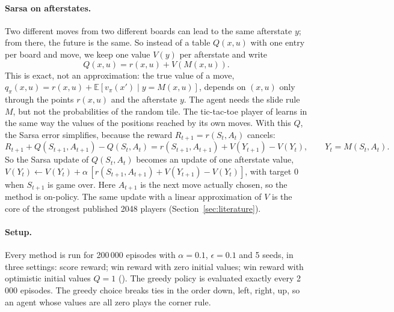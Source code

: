 \documentclass[11pt,a4paper]{article}
\theoremstyle{remark}
\newcommand{\E}{\mathbb{E}}
\newcommand{\act}[1]{\textsf{#1}}
\begin{document}
\paragraph{Sarsa on afterstates.} Two different moves from two different boards can lead to the same afterstate $y$; from there, the future is the same. So instead of a table $Q(x,u)$ with one entry per board and move, we keep one value $V(y)$ per afterstate and write
\[
Q(x,u)=r(x,u)+V(M(x,u)).
\]
This is exact, not an approximation: the true value of a move, $q_\pi(x,u)=r(x,u)+\E[v_\pi(x')\mid y=M(x,u)]$, depends on $(x,u)$ only through the points $r(x,u)$ and the afterstate $y$. The agent needs the slide rule $M$, but not the probabilities of the random tile. The tic-tac-toe player of \cite[\S1.5]{sutton2018} learns in the same way the values of the positions reached by its own moves. With this $Q$, the Sarsa error simplifies, because the reward $R_{t+1}=r(S_t,A_t)$ cancels:
\[
R_{t+1}+Q(S_{t+1},A_{t+1})-Q(S_t,A_t)=r(S_{t+1},A_{t+1})+V(Y_{t+1})-V(Y_t),\qquad Y_t=M(S_t,A_t).
\]
So the Sarsa update of $Q(S_t,A_t)$ becomes an update of one afterstate value, $V(Y_t)\leftarrow V(Y_t)+\alpha\,[r(S_{t+1},A_{t+1})+V(Y_{t+1})-V(Y_t)]$, with target 0 when $S_{t+1}$ is game over. Here $A_{t+1}$ is the next move actually chosen, so the method is on-policy. The same update with a linear approximation of $V$ is the core of the strongest published 2048 players (Section~\ref{sec:literature}).

\paragraph{Setup.} Every method is run for 200\,000 episodes with $\alpha=0.1$, $\epsilon=0.1$ and 5 seeds, in three settings: score reward; win reward with zero initial values; win reward with optimistic initial values $Q=1$ (\cite[\S2.6]{sutton2018}). The greedy policy is evaluated exactly every 2\,000 episodes. The greedy choice breaks ties in the order \act{down}, \act{left}, \act{right}, \act{up}, so an agent whose values are all zero plays the corner rule.
\end{document}
